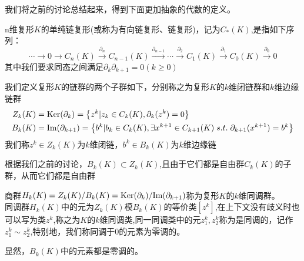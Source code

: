 我们将之前的讨论总结起来，得到下面更加抽象的代数的定义。
\begin{definition}
n维复形$K$的单纯链复形(或称为有向链复形、链复形)，记为$C_{*}(K)$,是指如下序列：
\begin{equation*}
    \cdots\rightarrow0\rightarrow C_{n}(K)\xrightarrow{\partial_{n}}C_{n-1}(K)\xrightarrow{\partial_{n-1}}\cdots \xrightarrow{\partial_{2}}C_{1}(K)\xrightarrow{\partial_{1}}C_{0}(K)\xrightarrow{\partial_{0}}0
\end{equation*}
 其中我们要求同态之间满足$\partial_{k}\partial_{k+1}=0(k\geq 0)$
\end{definition}
\begin{definition}
我们定义复形$K$的链群的两个子群如下，分别称之为复形$K$的$k$维闭链群和$k$维边缘链群
\begin{equation*}
    \begin{aligned}
         Z_{k}(K)&={\rm Ker}(\partial_{k})=\left\{z^{k}|z_{k}\in C_{k}(K),\partial_{k}(z^{k})=0\right\}\\
         B_{k}(K)&={\rm Im}(\partial_{k+1})=\left\{b^{k}|b_{k}\in C_{k}(K),\exists x^{k+1}\in C_{k+1}(K)\;s.t.\;\partial_{k+1}(x^{k+1})=b^{k}\right\}\\
    \end{aligned}
\end{equation*}
我们称$z^{k}\in Z_{k}(K)$为$k$维闭链，$b^{k}\in B_{k}(K)$为$k$维边缘链
\end{definition}
\begin{remark}
根据我们之前的讨论，$B_{k}(K)\subset Z_{k}(K)$,且由于它们都是自由群$C_{k}(K)$的子群，从而它们都是自由群
\end{remark}
\begin{definition}
商群$H_{k}(K)=Z_{k}(K)/B_{k}(K)={\rm Ker}(\partial_{k})/{\rm Im}(\partial_{k+1})$称为复形$K$的$k$维同调群。\\
同调群$H_{k}(K)$中的元为$Z_{k}(K)$模$B_{k}(K)$的等价类$[z^{k}]$,在上下文没有歧义时也可以写为类$z^{k}$,称之为$K$的$k$维同调类,同一同调类中的元$z_{1}^{k},z_{2}^{k}$称为是同调的，记作$z_{1}^{k}\sim z^{k}_{2}$,特别地，我们称同调于$0$的元素为零调的。
\end{definition}
显然，$B_{k}(K)$中的元素都是零调的。

